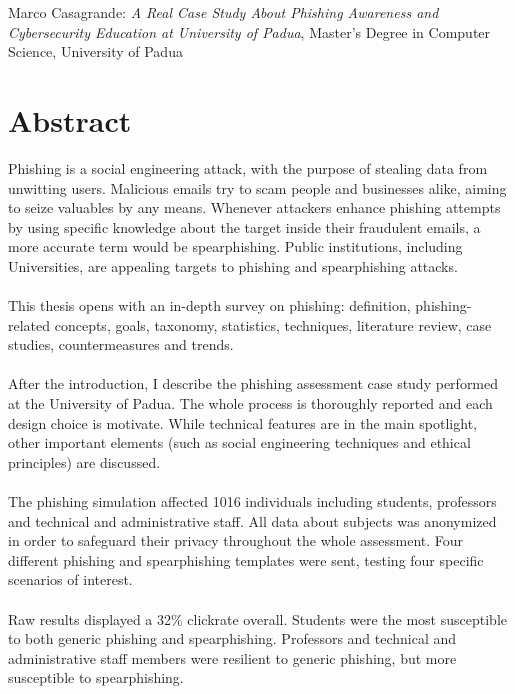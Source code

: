 \documentclass[a4paper]{article}
\begin{document}
\newpage

\vspace*{\fill}

\begin{center}
	\large{Marco Casagrande: \textit{A Real Case Study About Phishing Awareness and Cybersecurity Education at University of Padua}, Master's Degree in Computer Science, University of Padua}
\end{center}

\newpage

\section*{Abstract}
Phishing is a social engineering attack, with the purpose of stealing data from unwitting users. Malicious emails try to scam people and businesses alike, aiming to seize valuables by any means. Whenever attackers enhance phishing attempts by using specific knowledge about the target inside their fraudulent emails, a more accurate term would be spearphishing. Public institutions, including Universities, are appealing targets to phishing and spearphishing attacks. 
\\ \\
This thesis opens with an in-depth survey on phishing: definition, phishing-related concepts, goals, taxonomy, statistics, techniques, literature review, case studies, countermeasures and trends. 
\\ \\
After the introduction, I describe the phishing assessment case study performed at the University of Padua. The whole process is thoroughly reported and each design choice is motivate. While technical features are in the main spotlight, other important elements (such as social engineering techniques and ethical principles) are discussed.
\\ \\
The phishing simulation affected 1016 individuals including students, professors and technical and administrative staff. All data about subjects was anonymized in order to safeguard their privacy throughout the whole assessment. Four different phishing and spearphishing templates were sent, testing four specific scenarios of interest.
\\ \\
Raw results displayed a 32\% clickrate overall. Students were the most susceptible to both generic phishing and spearphishing. Professors and technical and administrative staff members were resilient to generic phishing, but more susceptible to spearphishing.
\end{document}
